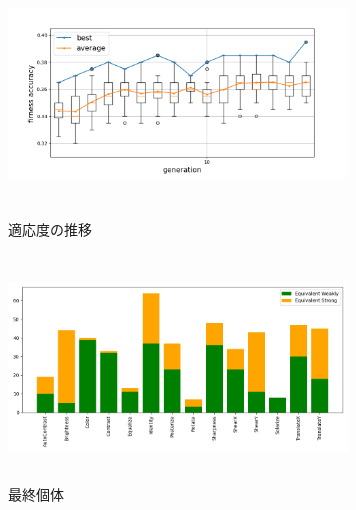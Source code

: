 \documentclass[twocolumn]{jarticle}     %
\begin{document}
\begin{table}[h]
	\centering
	\caption{テスト識別率\label{tb:test}}
\end{table}

\begin{figure}[h]
	\begin{center}
		\vspace*{3mm}
		\hspace*{-12mm}
		\includegraphics[height=65mm,width=90mm]{graph1_1.png}
		\caption{適応度の推移\label{fig:ex1_1}}
	\end{center}
\end{figure}

\begin{figure}[h]
	\begin{center}
		\vspace*{3mm}
		\hspace*{-12mm}
		\includegraphics[height=60mm,width=90mm]{graph1_2.png}
		\caption{最終個体\label{fig:ex1_2}}
	\end{center}
\end{figure}
\end{document}
